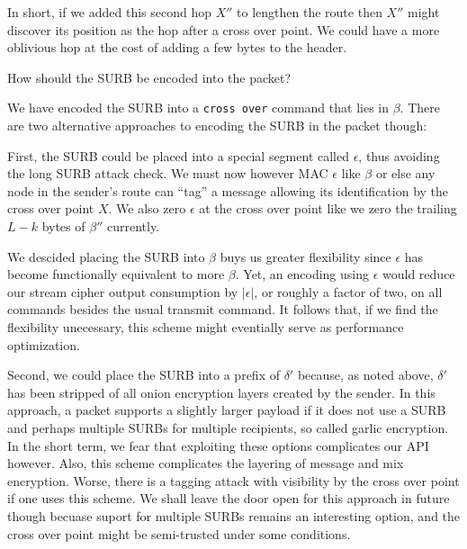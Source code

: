In short, if we added this second hop $X''$ to lengthen the route
then $X''$ might discover its position as the hop after a cross over
point.  We could have a more oblivious hop at the cost of adding a
few bytes to the header.

\begin{issue}
How should the SURB be encoded into the packet?
\end{issue}

We have encoded the SURB into a {\tt cross over} command that lies
in $\beta$.  There are two alternative approaches to encoding the
SURB in the packet though: 

First, the SURB could be placed into a special segment called
$\epsilon$, thus avoiding the long SURB attack check.
We must now however MAC $\epsilon$ like $\beta$ or else any
node in the sender's route can ``tag'' a message allowing its
identification by the cross over point $X$.  We also zero
$\epsilon$ at the cross over point like we zero the trailing
$L-k$ bytes of $\beta''$ currently.  

We descided placing the SURB into $\beta$ buys us greater flexibility
since $\epsilon$ has become functionally equivalent to more $\beta$.  
Yet, an encoding using $\epsilon$ would reduce our stream cipher
output consumption by $|\epsilon|$, or roughly a factor of two,
on all commands besides the usual transmit command.  It follows that,
if we find the flexibility unecessary, this scheme might eventially
serve as performance optimization. 

Second, we could place the SURB into a prefix of $\delta'$ because,
as noted above, $\delta'$ has been stripped of all onion encryption
layers created by the sender.  In this approach, a packet supports
a slightly larger payload if it does not use a SURB and perhaps
multiple SURBs for multiple recipients, so called garlic encryption.
In the short term, we fear that exploiting these options complicates
our API however.  Also, this scheme complicates the layering of
message and mix encryption.  Worse, there is a tagging attack with
visibility by the cross over point if one uses this scheme.  We shall
leave the door open for this approach in future though becuase suport
for multiple SURBs remains an interesting option, and the cross over
point might be semi-trusted under some conditions.





